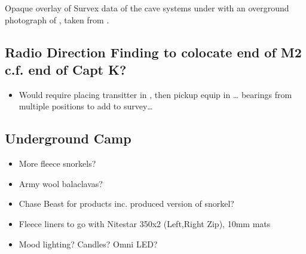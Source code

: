 \begin{survey}
\centering
{}
\caption[Overlay of pre-2009 Survex data with an overground photograph of Tolminski Migovec]{Opaque overlay of Survex data of the cave systems under  with an overground photograph of , taken from .}
\end{survey}


    \subsection{Radio Direction Finding to colocate end of M2 c.f. end of Capt K?}
        \begin{itemize}
            \item Would require placing transitter in , then pickup equip in \ldots{} bearings from multiple positions to add to survey\ldots{}
        \end{itemize}

    \subsection{Underground Camp}
        \begin{itemize}
            \item More fleece snorkels?
            \item Army wool balaclavas?
            \item Chase Beast for products inc. produced version of snorkel?
            \item Fleece liners to go with Nitestar 350x2 (Left,Right Zip), 10mm mats
            \item Mood lighting? Candles? Omni LED?
        \end{itemize}      
        
